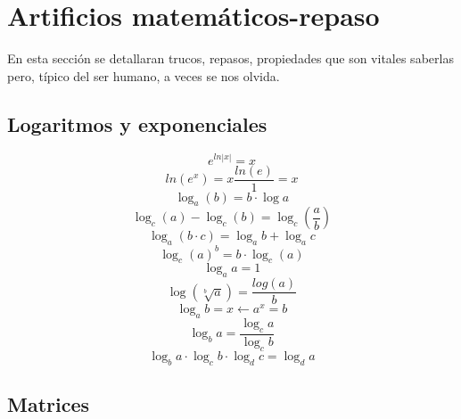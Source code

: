 \documentclass[
	11pt, %
	fleqn, %
	a4paper, %
]{LegrandOrangeBook}
\begin{document}
\chapter{Artificios matemáticos-repaso}
En esta sección se detallaran trucos, repasos, propiedades que son vitales saberlas pero, típico del ser humano, a veces se nos olvida.
\section{Logaritmos y exponenciales}
\begin{equation}\label{art:expaln}
e^{ln|x|}=x
\end{equation}
\begin{equation}\label{art:lnaexp}
ln(e^x)=x\frac{ln(e)}{1}=x
\end{equation}
\begin{equation}\label{art:logaritmos}
\log_a(b)=b\cdot\log a
\end{equation}
\begin{equation}\label{art:logdiv}
\log_c(a)-\log_c(b)=\log_c\left(\frac{a}{b}\right)
\end{equation}
\begin{equation}
\label{art:logmulti}
\log_a(b\cdot c)=\log_ab+\log_ac
\end{equation}
\begin{equation}\label{art:logexp}
\log_c(a)^b=b\cdot\log_c(a)
\end{equation}
\begin{equation}
\label{art:log1}
\log_aa=1
\end{equation}
\begin{equation}\label{art:raizlog}
\log\left(\sqrt[b]{a}\right)=\frac{log(a)}{b}
\end{equation}
\begin{equation}\label{art:log y expo}
\log_ab=x\leftarrow a^x=b
\end{equation}
\begin{equation}
\label{art:logcambio de bse}
\log_ba=\frac{\log_ca}{\log_cb}
\end{equation}
\begin{equation}
\label{art:log cadena}
\log_ba\cdot\log_cb\cdot\log_dc=\log_da
\end{equation}
\section{Matrices}
\end{document}

